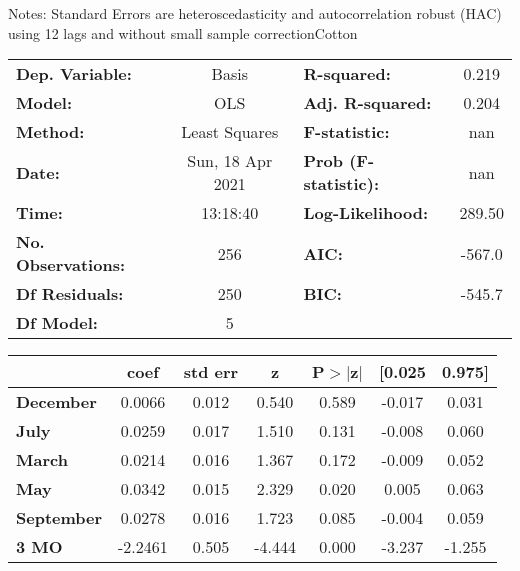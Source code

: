 Notes: \newline
 [1] Standard Errors are heteroscedasticity and autocorrelation robust (HAC) using 12 lags and without small sample correctionCotton\begin{center}
\begin{tabular}{lclc}
\toprule
\textbf{Dep. Variable:}    &      Basis       & \textbf{  R-squared:         } &     0.219   \\
\textbf{Model:}            &       OLS        & \textbf{  Adj. R-squared:    } &     0.204   \\
\textbf{Method:}           &  Least Squares   & \textbf{  F-statistic:       } &       nan   \\
\textbf{Date:}             & Sun, 18 Apr 2021 & \textbf{  Prob (F-statistic):} &      nan    \\
\textbf{Time:}             &     13:18:40     & \textbf{  Log-Likelihood:    } &    289.50   \\
\textbf{No. Observations:} &         256      & \textbf{  AIC:               } &    -567.0   \\
\textbf{Df Residuals:}     &         250      & \textbf{  BIC:               } &    -545.7   \\
\textbf{Df Model:}         &           5      & \textbf{                     } &             \\
\bottomrule
\end{tabular}
\begin{tabular}{lcccccc}
                   & \textbf{coef} & \textbf{std err} & \textbf{z} & \textbf{P$> |$z$|$} & \textbf{[0.025} & \textbf{0.975]}  \\
\midrule
\textbf{December}  &       0.0066  &        0.012     &     0.540  &         0.589        &       -0.017    &        0.031     \\
\textbf{July}      &       0.0259  &        0.017     &     1.510  &         0.131        &       -0.008    &        0.060     \\
\textbf{March}     &       0.0214  &        0.016     &     1.367  &         0.172        &       -0.009    &        0.052     \\
\textbf{May}       &       0.0342  &        0.015     &     2.329  &         0.020        &        0.005    &        0.063     \\
\textbf{September} &       0.0278  &        0.016     &     1.723  &         0.085        &       -0.004    &        0.059     \\
\textbf{3 MO}      &      -2.2461  &        0.505     &    -4.444  &         0.000        &       -3.237    &       -1.255     \\

\end{tabular}
\end{center}
